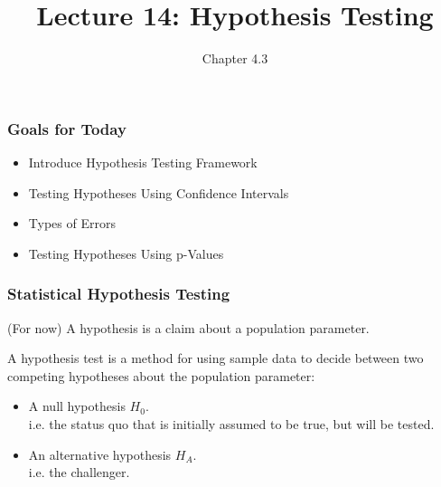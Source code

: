 \documentclass[handout]{beamer}
\title{Lecture 14: Hypothesis Testing}
\author{Chapter 4.3}
\date{}
\newcommand{\blue}[1]{\textcolor{blue2}{#1}}
\begin{document}
\begin{frame}
\titlepage
\end{frame}


\begin{frame}[fragile]
\frametitle{Goals for Today}

\begin{itemize}
\item Introduce Hypothesis Testing Framework
\item Testing Hypotheses Using Confidence Intervals
\item Types of Errors
\item Testing Hypotheses Using p-Values
\end{itemize}

\end{frame}


\begin{frame}
\frametitle{Statistical Hypothesis Testing}
(For now) A \blue{hypothesis} is a claim about a population parameter.

\vskip 0.25cm

\pause A \blue{hypothesis test} is a method for using sample data to decide between two competing hypotheses about the population parameter:
\begin{itemize}
\pause \item A \blue{null hypothesis $H_0$}.\\
i.e. the \blue{status quo} that is initially assumed to be true, but will be tested. 
\pause \item An \blue{alternative hypothesis $H_A$}.\\
i.e. the \blue{challenger}.
\end{itemize}

\end{frame}
\end{document}
